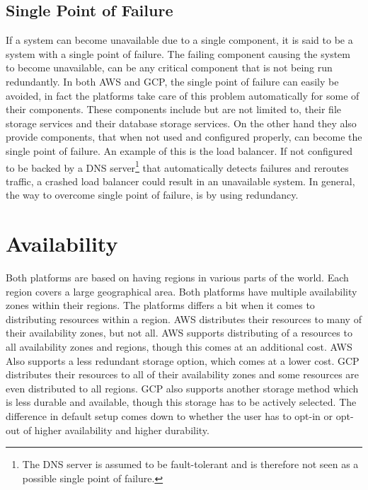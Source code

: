 \documentclass[11pt]{report}
\begin{document}
\subsection{Single Point of Failure}
If a system can become unavailable due to a single component, it is said to be a system with a single point of failure. The failing component causing the system to become unavailable, can be any critical component that is not being run redundantly. In both AWS and GCP, the single point of failure can easily be avoided, in fact the platforms take care of this problem automatically for some of their components. These components include but are not limited to, their file storage services and their database storage services. On the other hand they also provide components, that when not used and configured properly, can become the single point of failure. An example of this is the load balancer. If not configured to be backed by a DNS server\footnote{The DNS server is assumed to be fault-tolerant and is therefore not seen as a possible single point of failure.} that automatically detects failures and reroutes traffic, a crashed load balancer could result in an unavailable system. In general, the way to overcome single point of failure, is by using redundancy.

\section{Availability}
Both platforms are based on having regions in various parts of the world. Each region covers a large geographical area. Both platforms have multiple availability zones within their regions. The platforms differs a bit when it comes to distributing resources within a region. AWS distributes their resources to many of their availability zones, but not all. AWS supports distributing of a resources to all availability zones and regions, though this comes at an additional cost. AWS Also supports a less redundant storage option, which comes at a lower cost. GCP distributes their resources to all of their availability zones and some resources are even distributed to all regions. GCP also supports another storage method which is less durable and available, though this storage has to be actively selected. The difference in default setup comes down to whether the user has to opt-in or opt-out of higher availability and higher durability.
\end{document}
